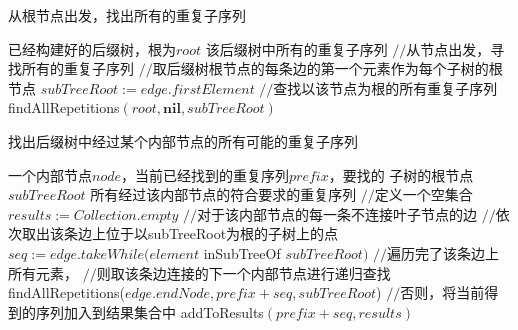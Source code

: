 \begin{algorithm}
  \caption{从根节点出发，找出所有的重复子序列\label{suffixtree:algo:fromroot}}
  \begin{algorithmic}[1]
    \Require 已经构建好的后缀树，根为$root$
    \Ensure 该后缀树中所有的重复子序列
    \State $//$从节点出发，寻找所有的重复子序列
    \State $//$取后缀树根节点的每条边的第一个元素作为每个子树的根节点
    \State $subTreeRoot := edge.firstElement$
    \State $//$查找以该节点为根的所有重复子序列
    \State findAllRepetitions$(root, \mathbf{nil}, subTreeRoot)$
    \EndFor
  \end{algorithmic}
\end{algorithm}

\begin{algorithm}
  \caption{找出后缀树中经过某个内部节点的所有可能的重复子序列}
  \label{suffixtree:algo:findrep}
  \begin{algorithmic}[1]
    \Require 一个内部节点$node$，当前已经找到的重复序列$prefix$，要找的
    子树的根节点$subTreeRoot$
    \Ensure 所有经过该内部节点的符合要求的重复序列
    \State $//$定义一个空集合
    \State $results := Collection.empty$
    \State $//$对于该内部节点的每一条不连接叶子节点的边
    \State $//$依次取出该条边上位于以subTreeRoot为根的子树上的点
    \State $seq := edge.takeWhile(element$ inSubTreeOf $subTreeRoot)$\label{suffixtree:code:equals}
    \State $//$遍历完了该条边上所有元素，
    \State $//$则取该条边连接的下一个内部节点进行递归查找
    \State findAllRepetitions($edge.endNode, prefix + seq, subTreeRoot$)
    \Else
    \State $//$否则，将当前得到的序列加入到结果集合中
    \State addToResults$(prefix + seq, results)$\label{suffixtree:code:add}
    \EndIf
    \EndFor
    \State {}
    \EndFunction
    \State
  \end{algorithmic}
\end{algorithm}

